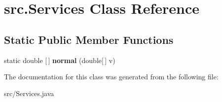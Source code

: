 \hypertarget{classsrc_1_1Services}{}\section{src.\+Services Class Reference}
\label{classsrc_1_1Services}
\subsection*{Static Public Member Functions}
\begin{DoxyCompactItemize}
\item 
\mbox{\label{classsrc_1_1Services_afb0da91ae8e15b6cdfbab39fcbf0fa9d}} 
static double \mbox{[}$\,$\mbox{]} {\bfseries normal} (double\mbox{[}$\,$\mbox{]} v)
\end{DoxyCompactItemize}


The documentation for this class was generated from the following file\+:\begin{DoxyCompactItemize}
\item 
src/Services.\+java\end{DoxyCompactItemize}
